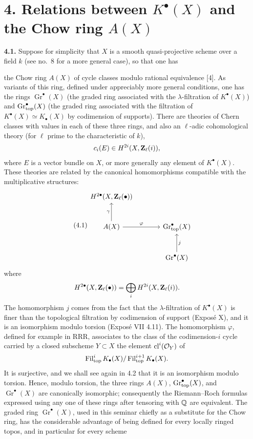 \section*{4. Relations between $K^\bullet(X)$ and the Chow ring $A(X)$}

\textbf{4.1.} Suppose for simplicity that $X$ is a smooth quasi-projective
scheme over a field $k$ (see no.~8 for a more general case), so that one has

the Chow ring $A(X)$ of cycle classes modulo rational equivalence [4]. As
variants of this ring, defined under appreciably more general conditions,
one has the rings $\operatorname{Gr}^\bullet(X)$ (the graded ring associated
with the $\lambda$-filtration of $K^\bullet(X)$) and
$\operatorname{Gr}_{\mathrm{top}}^\bullet(X)$ (the graded ring associated with the filtration of
$K^\bullet(X)\simeq K_\bullet(X)$ by codimension of supports). There are
theories of Chern classes with values in each of these three rings, and also
an $\ell$-adic cohomological theory (for $\ell$ prime to the characteristic
of $k$),
\[
 c_i(E)\in H^{2i}(X,\mathbf Z_\ell(i)),
\]
where $E$ is a vector bundle on $X$, or more generally any element of
$K^\bullet(X)$. These theories are related by the canonical homomorphisms
compatible with the multiplicative structures:
\begin{equation}\tag{4.1}
\begin{tikzcd}[column sep=large,row sep=large]
 H^{2\bullet}(X,\Zell(\bullet)) & {} \\
 A(X) \arrow[u,"\gamma"] \arrow[r,"\varphi"] & \Gtop^\bullet(X) \\
 {} & \operatorname{Gr}^\bullet(X) \arrow[u,"j"']
\end{tikzcd}
\end{equation}
where
\[
 H^{2\bullet}(X,\mathbf Z_\ell(\bullet))
   =\bigoplus_i H^{2i}(X,\mathbf Z_\ell(i)).
\]
The homomorphism $j$ comes from the fact that the $\lambda$-filtration of
$K^\bullet(X)$ is finer than the topological filtration by codimension of
support (Exposé X), and it is an isomorphism modulo torsion (Exposé VII
4.11). The homomorphism $\varphi$, defined for example in RRR, associates
to the class of the codimension-$i$ cycle carried by a closed subscheme
$Y\subset X$ the element $\operatorname{cl}^i(\mathcal O_Y)$ of
\[
 \operatorname{Fil}^i_{\mathrm{top}}K_\bullet(X)
   /\operatorname{Fil}^{i+1}_{\mathrm{top}}K_\bullet(X).
\]
It is surjective, and we shall see again in 4.2 that it is an isomorphism
modulo torsion. Hence, modulo torsion, the three rings $A(X)$,
$\operatorname{Gr}_{\mathrm{top}}^\bullet(X)$, and $\operatorname{Gr}^\bullet(X)$ are canonically
isomorphic; consequently the Riemann--Roch formulas expressed using any one
of these rings after tensoring with $\mathbb Q$ are equivalent. The graded ring
$\operatorname{Gr}^\bullet(X)$, used in this seminar chiefly as a substitute
for the Chow ring, has the considerable advantage of being defined for
every locally ringed topos, and in particular for every scheme

